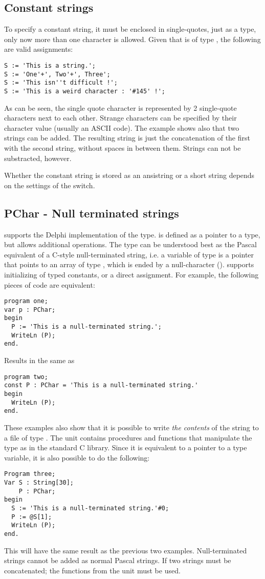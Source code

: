 \subsection{Constant strings}
To specify a constant string, it must be enclosed in single-quotes, just
as a  type, only now more than one character is allowed.
Given that  is of type , the following are valid assignments:
\begin{verbatim}
S := 'This is a string.';
S := 'One'+', Two'+', Three';
S := 'This isn''t difficult !';
S := 'This is a weird character : '#145' !';
\end{verbatim}
As can be seen, the single quote character is represented by 2 single-quote
characters next to each other. Strange characters can be specified by their
character value (usually an ASCII code).
The example shows also that two strings can be added. The resulting string is
just the concatenation of the first with the second string, without spaces in
between them. Strings can not be substracted, however.

Whether the constant string is stored as an ansistring or a short string
depends on the settings of the  switch.

\subsection{PChar - Null terminated strings}
\fpc supports the Delphi implementation of the  type. 
is defined as a pointer to a  type, but allows additional
operations.
The  type can be understood best as the Pascal equivalent of a
C-style null-terminated string, i.e. a variable of type  is a
pointer that points to an array of type , which is ended by a
null-character ().
\fpc supports initializing of  typed constants, or a direct
assignment. For example, the following pieces of code are equivalent:
\begin{verbatim}
program one;
var p : PChar;
begin
  P := 'This is a null-terminated string.';
  WriteLn (P);
end.
\end{verbatim}
Results in the same as
\begin{verbatim}
program two;
const P : PChar = 'This is a null-terminated string.'
begin
  WriteLn (P);
end.
\end{verbatim}
These examples also show that it is possible to write {\em the contents} of
the string to a file of type .
The \seestrings unit contains procedures and functions that manipulate the
 type as in the standard C library.
Since it is equivalent to a pointer to a type  variable, it  is
also possible to do the following:
\begin{verbatim}
Program three;
Var S : String[30];
    P : PChar;
begin
  S := 'This is a null-terminated string.'#0;
  P := @S[1];
  WriteLn (P);
end.
\end{verbatim}
This will have the same result as the previous two examples.
Null-terminated strings cannot be added as normal Pascal
strings. If two  strings must be concatenated; the functions from
the unit \seestrings must be used.


